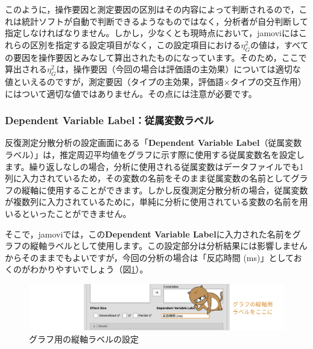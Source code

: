 \documentclass[
  12pt,
  a5jpaper,
  lualatex, ja=standard]{bxjsbook}
\begin{document}
このように，操作要因と測定要因の区別はその内容によって判断されるので，これは統計ソフトが自動で判断できるようなものではなく，分析者が自分判断して指定しなければなりません。しかし，少なくとも現時点において，jamoviにはこれらの区別を指定する設定項目がなく，この設定項目における\(\eta^2_G\)の値は，すべての要因を操作要因とみなして算出されたものになっています。そのため，ここで算出される\(\eta^2_G\)は，操作要因（今回の場合は評価語の主効果）については適切な値といえるのですが，測定要因（タイプの主効果，評価語×タイプの交互作用）にはついて適切な値ではありません。その点には注意が必要です。

\hypertarget{dependent-variable-labelux5f93ux5c5eux5909ux6570ux30e9ux30d9ux30eb}{%
\subsubsection*{Dependent Variable Label：従属変数ラベル}\label{dependent-variable-labelux5f93ux5c5eux5909ux6570ux30e9ux30d9ux30eb}}

反復測定分散分析の設定画面にある「\textbf{Dependent Variable Label}（従属変数ラベル）」は，推定周辺平均値をグラフに示す際に使用する従属変数名を設定します。繰り返しなしの場合，分析に使用される従属変数はデータファイルでも1列に入力されているため，その変数の名前をそのまま従属変数の名前としてグラフの縦軸に使用することができます。しかし反復測定分散分析の場合，従属変数が複数列に入力されているために，単純に分析に使用されている変数の名前を用いるといったことができません。

そこで，jamoviでは，この\textbf{Dependent Variable Label}に入力された名前をグラフの縦軸ラベルとして使用します。この設定部分は分析結果には影響しませんからそのままでもよいですが，今回の分析の場合は「反応時間 (ms)」としておくのがわかりやすいでしょう（図\ref{fig:ANOVA-rm-dv-label}）。

\begin{figure}[!ht]

{\centering \includegraphics[width=1\linewidth]{images/ANOVA/rm-dv-label} 

}

\caption{グラフ用の縦軸ラベルの設定}\label{fig:ANOVA-rm-dv-label}
\end{figure}
\end{document}
